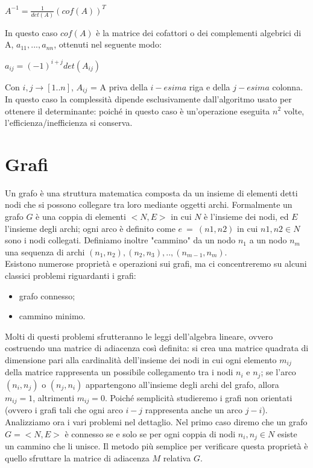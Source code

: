 \begin{center}
{$A^{-1} = \frac{1}{det(A)}(cof(A))^T$\\}
\end{center}
In questo caso $cof(A)$ è la matrice dei cofattori o dei complementi algebrici di A, $a_{11}, ..., a_{nn}$, ottenuti nel seguente modo:
\begin{center}
{$a_{ij} = (-1)^{i+j} det(A_{ij})$ \\}
\end{center}
Con $i,j\rightarrow[1..n]$, $A_{ij}$ = A priva della $i-esima$ riga e della $j-esima$ colonna.\\
In questo caso la complessità dipende esclusivamente dall'algoritmo usato per ottenere il determinante: poiché in questo caso è un'operazione eseguita $n^2$ volte, l'efficienza/inefficienza si conserva.
\section{Grafi}
Un grafo è una struttura matematica composta da un insieme di elementi detti nodi che si possono collegare tra loro mediante oggetti archi. Formalmente un grafo $G$ è una coppia di elementi $<N, E>$ in cui $N$ è l'insieme dei nodi, ed $E$ l'insieme degli archi; ogni arco è definito come $e \ = \ (n1,n2)$ in cui $n1,n2 \in N$ sono i nodi collegati. Definiamo inoltre "cammino" da un nodo $n_1$ a un nodo $n_m$ una sequenza di archi $(n_1,n_2),(n_2,n_3),..,(n_{m-1}, n_m)$.\\
Esistono numerose proprietà e operazioni sui grafi, ma ci concentreremo su alcuni classici problemi riguardanti i grafi:
\begin{itemize}
\item{grafo connesso;}
\item{cammino minimo.}
\end{itemize}
Molti di questi problemi sfrutteranno le leggi dell'algebra lineare, ovvero costruendo una matrice di adiacenza così definita: si crea una matrice quadrata di dimensione pari alla cardinalità dell'insieme dei nodi in cui ogni elemento $m_{ij}$ della matrice rappresenta un possibile collegamento tra i nodi $n_i$ e $n_j$; se l'arco $(n_i,n_j)$ o $(n_j,n_i)$ appartengono all'insieme degli archi del grafo, allora $m_{ij} = 1$, altrimenti $m_{ij} = 0$. Poiché semplicità studieremo i grafi non orientati (ovvero i grafi tali che ogni arco $i-j$ rappresenta anche un arco $j-i$).\\
Analizziamo ora i vari problemi nel dettaglio. Nel primo caso diremo che un grafo $G = <N, E>$ è connesso se e solo se per ogni coppia di nodi $n_i, n_j \in N$ esiste un cammino che li unisce. Il metodo più semplice per verificare questa proprietà è quello sfruttare la matrice di adiacenza $M$ relativa $G$. 
